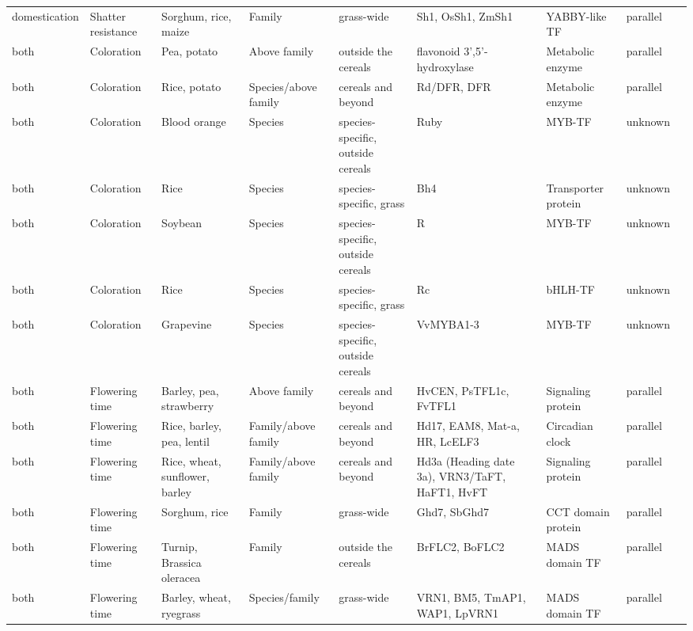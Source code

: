 \documentclass[12pt]{article}
\begin{document}
\begin{table}
\begin{center}
\begin{tabular}{C{1.5cm}G{2.5cm}C{3.10cm}C{3.2cm}C{2.3cm}G{3.5cm}G{2.1cm}C{1.3cm}G{1.5cm}}
 domestication & Shatter resistance &Sorghum, rice, maize & Family & grass-wide & Sh1, OsSh1, ZmSh1 & YABBY-like TF & parallel & \citep{Lin2012}\\
 both & Coloration &Pea, potato & Above family & outside the cereals & flavonoid 3',5'-hydroxylase & Metabolic enzyme & parallel & \citep{Martin2013}\\
 both & Coloration &Rice, potato & Species/above family & cereals and beyond & Rd/DFR, DFR & Metabolic enzyme & parallel & \citep{Furukawa2006, Zhang2009}\\
 both & Coloration &Blood orange & Species & species-specific, outside cereals & Ruby & MYB-TF & unknown & \citep{Butelli2012}\\
 both & Coloration &Rice & Species & species-specific, grass & Bh4 & Transporter protein & unknown & \citep{Zhu2011}\\
 both & Coloration &Soybean & Species & species-specific, outside cereals & R & MYB-TF & unknown & \citep{Gillman2011}\\
 both & Coloration &Rice & Species & species-specific, grass & Rc & bHLH-TF & unknown & \citep{Martin2013}\\
 both & Coloration &Grapevine & Species & species-specific, outside cereals & VvMYBA1-3 & MYB-TF & unknown & \citep{Martin2013}\\
 both & Flowering time &Barley, pea, strawberry & Above family & cereals and beyond & HvCEN, PsTFL1c, FvTFL1 & Signaling protein & parallel & \citep{Comadran2012, Foucher2003, Koskela2012}\\
 both & Flowering time &Rice, barley, pea, lentil & Family/above family & cereals and beyond & Hd17, EAM8, Mat-a, HR, LcELF3 & Circadian clock& parallel & \citep{Weller2012, Matsubara2012, Zakhrabekova2012, Faure2012}\\
 both & Flowering time &Rice, wheat, sunflower, barley & Family/above family & cereals and beyond & Hd3a (Heading date 3a), VRN3/TaFT, HaFT1, HvFT & Signaling protein & parallel & \citep{Yan2006, Takahashi2009, Blackman2010}\\
 both & Flowering time &Sorghum, rice & Family & grass-wide & Ghd7, SbGhd7 & CCT domain protein& parallel & \citep{Xue2008, Murphy2014}\\
 both & Flowering time &Turnip, Brassica oleracea & Family & outside the cereals & BrFLC2, BoFLC2 & MADS domain TF & parallel & \citep{Wu2012, Yuan2009, Okazaki2006}\\
 both & Flowering time &Barley, wheat, ryegrass & Species/family & grass-wide & VRN1, BM5, TmAP1, WAP1, LpVRN1 & MADS domain TF & parallel & \citep{Asp2011}\\

\end{tabular}
\end{center}
\end{table}
\end{document}
